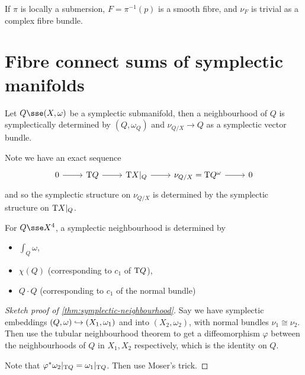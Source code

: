 \documentclass{article}
\begin{document}
\lec

\begin{remark}
    If \(\pi\) is locally a submersion, \(F = \pi^{-1}(p)\) is a smooth fibre, and \(\nu_F\) is trivial as a complex fibre bundle.
\end{remark}

\section{Fibre connect sums of symplectic manifolds}

\begin{theorem}
    \label{thm:symplectic-neighbourhood}
    Let \(Q \sse (X, \omega)\) be a symplectic submanifold, then a neighbourhood of \(Q\) is symplectically determined by \((Q, \omega_Q)\) and \(\nu_{Q/X} \to Q\) as a symplectic vector bundle.
\end{theorem}

Note we have an exact sequence
\[\begin{tikzcd}
	0 & {\T Q} & {\T X\vert_Q} & {\nu_{Q/X}=\T Q^\omega} & 0
	\arrow[from=1-1, to=1-2]
	\arrow[from=1-2, to=1-3]
	\arrow[from=1-3, to=1-4]
	\arrow[from=1-4, to=1-5]
\end{tikzcd}\]
and so the symplectic structure on \(\nu_{Q/X}\) is determined by the symplectic structure on \(\mathrm{T} X\vert_Q\).

\begin{corollary}
    For \(Q \sse X^4\), a symplectic neighbourhood is determined by
    \begin{itemize}
        \item \(\int_Q\omega\),
        \item \(\chi(Q)\) (corresponding to \(c_1\) of \(\mathrm{T} Q\)),
        \item \(Q \cdot Q\) (corresponding to \(c_1\) of the normal bundle)
    \end{itemize}
\end{corollary}

\begin{proof}
    [Sketch proof of \cref{thm:symplectic-neighbourhood}]

    Say we have symplectic embeddings \((Q, \omega) \hookrightarrow (X_1, \omega_1)\) and into \((X_2, \omega_2)\), with normal bundles \(\nu_1 \cong \nu_2\). Then use the tubular neighbourhood theorem to get a diffeomorphism \(\varphi\) between the neighbourhoods of \(Q\) in \(X_1, X_2\) respectively, which is the identity on \(Q\).

    Note that \(\varphi^*\omega_2\vert_{\mathrm{T} Q} = \omega_1\vert_{\mathrm{T} Q}\). Then use Moser's trick.
\end{proof}
\end{document}
